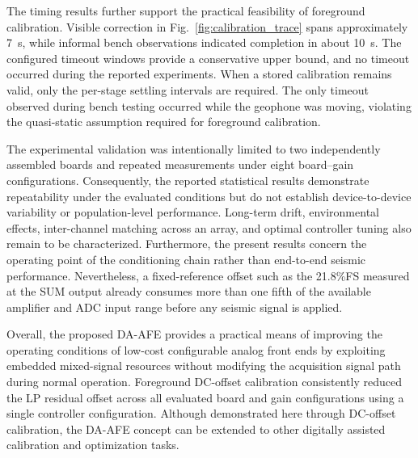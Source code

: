 The timing results further support the practical feasibility of foreground calibration. Visible correction in Fig.~\ref{fig:calibration_trace} spans approximately 7~s, while informal bench observations indicated completion in about 10~s. The configured timeout windows provide a conservative upper bound, and no timeout occurred during the reported experiments. When a stored calibration remains valid, only the per-stage settling intervals are required. The only timeout observed during bench testing occurred while the geophone was moving, violating the quasi-static assumption required for foreground calibration.

The experimental validation was intentionally limited to two independently assembled boards and repeated measurements under eight board--gain configurations. Consequently, the reported statistical results demonstrate repeatability under the evaluated conditions but do not establish device-to-device variability or population-level performance. Long-term drift, environmental effects, inter-channel matching across an array, and optimal controller tuning also remain to be characterized. Furthermore, the present results concern the operating point of the conditioning chain rather than end-to-end seismic performance. Nevertheless, a fixed-reference offset such as the 21.8\%FS measured at the SUM output already consumes more than one fifth of the available amplifier and ADC input range before any seismic signal is applied.

Overall, the proposed DA-AFE provides a practical means of improving the operating conditions of low-cost configurable analog front ends by exploiting embedded mixed-signal resources without modifying the acquisition signal path during normal operation. Foreground DC-offset calibration consistently reduced the LP residual offset across all evaluated board and gain configurations using a single controller configuration. Although demonstrated here through DC-offset calibration, the DA-AFE concept can be extended to other digitally assisted calibration and optimization tasks.
